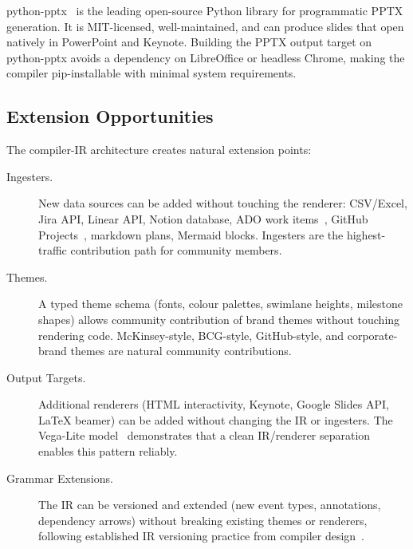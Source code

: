 python-pptx~\cite{python-pptx} is the leading open-source Python library for
programmatic PPTX generation.
It is MIT-licensed, well-maintained, and can produce slides that open
natively in PowerPoint and Keynote.
Building the PPTX output target on python-pptx avoids a dependency on
LibreOffice or headless Chrome, making the compiler pip-installable with
minimal system requirements.

\subsection{Extension Opportunities}
\label{sec:oss-extensions}

The compiler-IR architecture creates natural extension points:

\begin{description}
  \item[Ingesters.] New data sources can be added without touching the
        renderer: CSV/Excel, Jira API, Linear API, Notion database, ADO
        work items~\cite{ado-workitems}, GitHub Projects~\cite{github-projects},
        markdown plans, Mermaid blocks.
        Ingesters are the highest-traffic contribution path for community
        members.

  \item[Themes.] A typed theme schema (fonts, colour palettes, swimlane
        heights, milestone shapes) allows community contribution of brand
        themes without touching rendering code.
        McKinsey-style, BCG-style, GitHub-style, and corporate-brand themes
        are natural community contributions.

  \item[Output Targets.] Additional renderers (HTML interactivity, Keynote,
        Google Slides API, LaTeX beamer) can be added without changing the
        IR or ingesters.
        The Vega-Lite model~\cite{vegalite2017} demonstrates that a clean
        IR/renderer separation enables this pattern reliably.

  \item[Grammar Extensions.] The IR can be versioned and extended (new event
        types, annotations, dependency arrows) without breaking existing
        themes or renderers, following established IR versioning practice
        from compiler design~\cite{dragonbook2006}.
\end{description}

